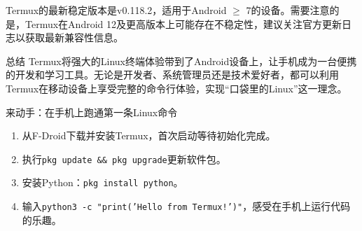 Termux的最新稳定版本是v0.118.2，适用于Android $\geq$ 7的设备。需要注意的是，Termux在Android 12及更高版本上可能存在不稳定性，建议关注官方更新日志以获取最新兼容性信息。

\begin{tcbinfo}{总结}
Termux将强大的Linux终端体验带到了Android设备上，让手机成为一台便携的开发和学习工具。无论是开发者、系统管理员还是技术爱好者，都可以利用Termux在移动设备上享受完整的命令行体验，实现“口袋里的Linux”这一理念。

\end{tcbinfo}

\begin{tcbpractice}{来动手：在手机上跑通第一条Linux命令}
\begin{enumerate}
  \item 从F-Droid下载并安装Termux，首次启动等待初始化完成。
  \item 执行\texttt{pkg update \&\& pkg upgrade}更新软件包。
  \item 安装Python：\texttt{pkg install python}。
  \item 输入\texttt{python3 -\allowbreak c "print('Hello from Termux!')"}，感受在手机上运行代码的乐趣。
\end{enumerate}

\end{tcbpractice}
